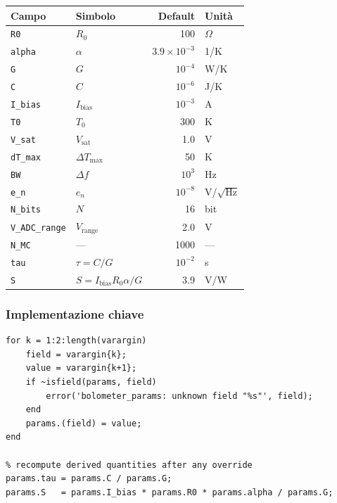 \documentclass[11pt,a4paper]{article}
\begin{document}
\begin{center}
\begin{tabular}{llrl}
\toprule
Campo & Simbolo & Default & Unità \\
\midrule
\texttt{R0}        & $R_0$             & 100        & $\Omega$ \\
\texttt{alpha}     & $\alpha$          & $3.9\times10^{-3}$ & 1/K \\
\texttt{G}         & $G$               & $10^{-4}$  & W/K \\
\texttt{C}         & $C$               & $10^{-6}$  & J/K \\
\texttt{I\_bias}   & $I_{\text{bias}}$ & $10^{-3}$  & A \\
\texttt{T0}        & $T_0$             & 300        & K \\
\texttt{V\_sat}    & $V_{\text{sat}}$  & 1.0        & V \\
\texttt{dT\_max}   & $\Delta T_{\max}$ & 50         & K \\
\texttt{BW}        & $\Delta f$        & $10^3$     & Hz \\
\texttt{e\_n}      & $e_n$             & $10^{-8}$  & V/$\sqrt{\text{Hz}}$ \\
\texttt{N\_bits}   & $N$               & 16         & bit \\
\texttt{V\_ADC\_range} & $V_{\text{range}}$ & 2.0  & V \\
\texttt{N\_MC}     & ---                 & 1000       & --- \\
\midrule
\texttt{tau} & $\tau=C/G$ & $10^{-2}$ & s \\
\texttt{S}   & $S = I_{\text{bias}}R_0\alpha/G$ & 3.9 & V/W \\
\bottomrule
\end{tabular}
\end{center}

\subsubsection*{Implementazione chiave}

\begin{lstlisting}[caption={Override e ricalcolo campi derivati in bolometer\_params.m}]
% override with name-value pairs
for k = 1:2:length(varargin)
    field = varargin{k};
    value = varargin{k+1};
    if ~isfield(params, field)
        error('bolometer_params: unknown field "%s"', field);
    end
    params.(field) = value;
end

% recompute derived quantities after any override
params.tau = params.C / params.G;
params.S   = params.I_bias * params.R0 * params.alpha / params.G;
\end{lstlisting}
\end{document}
